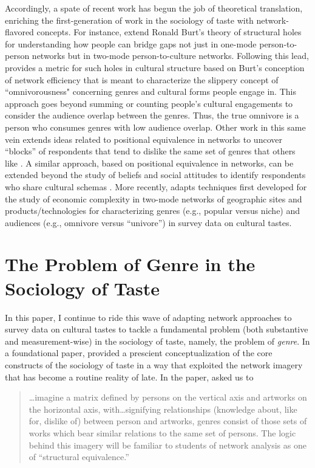 \documentclass[a4paper,12pt]{extarticle}
\begin{document}
Accordingly, a spate of recent work has begun the job of theoretical translation, enriching the first-generation of work in the sociology of taste with network-flavored concepts. For instance, \citet{pachucki2010cultural} extend Ronald Burt's theory of structural holes for understanding how people can bridge gaps not just in one-mode person-to-person networks but in two-mode person-to-culture networks. Following this lead, \citet{lizardo14} provides a metric for such holes in cultural structure based on Burt's conception of network efficiency that is meant to characterize the slippery concept of ``omnivorousness" concerning genres and cultural forms people engage in. This approach goes beyond summing or counting people's cultural engagements to consider the audience overlap between the genres. Thus, the true omnivore is a person who consumes genres with low audience overlap. Other work in this same vein extends ideas related to positional equivalence in networks \citep[see][]{breiger1976social} to uncover ``blocks'' of respondents that tend to dislike the same set of genres that others like \citep{okada2017structure}. A similar approach, based on positional equivalence in networks, can be extended beyond the study of beliefs and social attitudes to identify respondents who share cultural schemas \citep{goldberg2011mapping}. More recently, \citet{lizardo18} adapts techniques first developed for the study of economic complexity in two-mode networks of geographic sites and products/technologies \citep{hidalgo2009building} for characterizing genres (e.g., popular versus niche) and audiences (e.g., omnivore versus ``univore'') in survey data on cultural tastes. 

\section{The Problem of Genre in the Sociology of Taste}
In this paper, I continue to ride this wave of adapting network approaches to survey data on cultural tastes to tackle a fundamental problem (both substantive and measurement-wise) in the sociology of taste, namely, the problem of \textit{genre}. In a foundational paper, \citet{dimaggio1987classification} provided a prescient conceptualization of the core constructs of the sociology of taste in a way that exploited the network imagery that has become a routine reality of late. In the paper, \citet[244]{dimaggio1987classification} asked us to

\begin{quote}
   {\dots}imagine a matrix defined by persons on the vertical axis and artworks on the horizontal axis, with{\dots}signifying relationships (knowledge about, like for, dislike of) between person and artworks, genres consist of those sets of works which bear similar relations to the same set of persons. The logic behind this imagery will be familiar to students of network analysis as one of ``structural equivalence.''
\end{quote}
\end{document}
